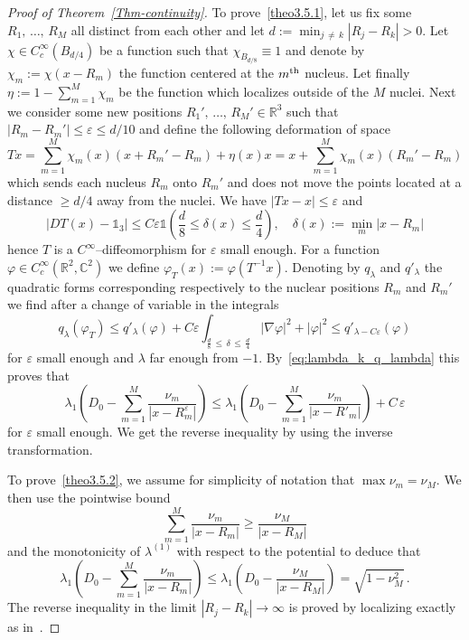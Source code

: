 \documentclass[AHL,Unicode,published]{cedram}
\newcommand{\R}{\mathbb{R}}
\newcommand{\C}{\mathbb{C}}
\newcommand\1{{\ensuremath {\mathds 1} }}
\renewcommand\phi{\varphi}
\newcommand{\ii}{\infty}
\renewcommand{\geq}{\geqslant}
\renewcommand{\leq}{\leqslant}
\newcommand{\eps}{\varepsilon}
\begin{document}
\begin{proof}[Proof of Theorem~\ref{Thm-continuity}]
To prove~\eqref{theo3.5.1}, let us fix some $R_1,\,\dots,\,R_M$ all distinct from each other and let $d:=\min_{j\,\neq\,k}|R_j-R_k|>0$. Let $\chi\in C^\ii_c(B_{d/4})$ be a function such that $\chi_{B_{d/8}}\equiv1$ and denote by $\chi_m:=\chi(x-R_m)$ the function centered at the $m^{\rm th}$ nucleus. Let finally $\eta:=1-\sum_{m=1}^M\chi_m$ be the function which localizes outside of the $M$ nuclei. Next we consider some new positions $R_1',\,\dots,\,R_M'\in\R^3$ such that $|R_m-R_m'|\leq \eps\leq d/10$ and define the following deformation of space
\[
Tx=\sum_{m=1}^M\chi_m(x) \left(x+R_m'-R_m\right)+\eta(x) x=x+\sum_{m=1}^M\chi_m(x) \left(R_m'-R_m\right)
\]
which sends each nucleus $R_m$ onto $R_m'$ and does not move the points located at a distance $\geq d/4$ away from the nuclei. We have $|Tx-x|\leq \eps$ and
\[
\left|DT(x)-\1_3\right|\leq C\eps\1\left(\frac{d}8 \leq \delta(x)\leq \frac{d}4\right),\quad \delta(x):=\min_m\left|x-R_m\right|
\]
hence $T$ is a $C^\ii$--diffeomorphism for $\eps$ small enough. For a function $\phi\in C^\ii_c(\R^2,\C^2)$ we define $\phi_T(x):=\phi(T^{-1}x)$. Denoting by $q_\lambda$ and $q'_\lambda$ the quadratic forms corresponding respectively to the nuclear positions $R_m$ and $R_m'$ we find after a change of variable in the integrals
\[
q_\lambda(\phi_T)\leq q'_\lambda(\phi)+C\eps \int_{\frac{d}8 \,\leq\,\delta\,\leq\,\frac{d}4}\left|\nabla \phi\right|^2+|\phi|^2\leq q'_{\lambda-C\eps}(\phi)
\]
for $\eps$ small enough and $\lambda$ far enough from $-1$. By~\eqref{eq:lambda_k_q_lambda} this proves that
\[
\lambda_1\left(D_0-\sum_{m=1}^M\frac{\nu_m}{\left|x-R^\varepsilon_m\right|}\right)\le \lambda_1\left(D_0-\sum_{m=1}^M\frac{\nu_m}{\left|x-R'_m\right|}\right)+C\,\varepsilon
\]
for $\eps$ small enough. We get the reverse inequality by using the inverse transformation.

To prove~\eqref{theo3.5.2}, we assume for simplicity of notation that $\max\nu_m=\nu_M$. We then use the pointwise bound
\[
\sum_{m=1}^M\frac{\nu_m}{\left|x-R_m\right|}\geq \frac{\nu_M}{\left|x-R_M\right|}
\]
and the monotonicity of $\lambda^{(1)}$ with respect to the potential to deduce that
\[
\lambda_1\left(D_0-\sum_{m=1}^M\frac{\nu_m}{\left|x-R_m\right|}\right)\le \lambda_1\left(D_0-\frac{\nu_M}{\left|x-R_M\right|}\right) = \sqrt{1-\nu_M^2}\,.
\]
The reverse inequality in the limit $|R_j-R_k|\to\ii$ is proved by localizing exactly as in~\cite[Corollary~4.7]{BosDolEst-08}.


\end{proof}
\end{document}
